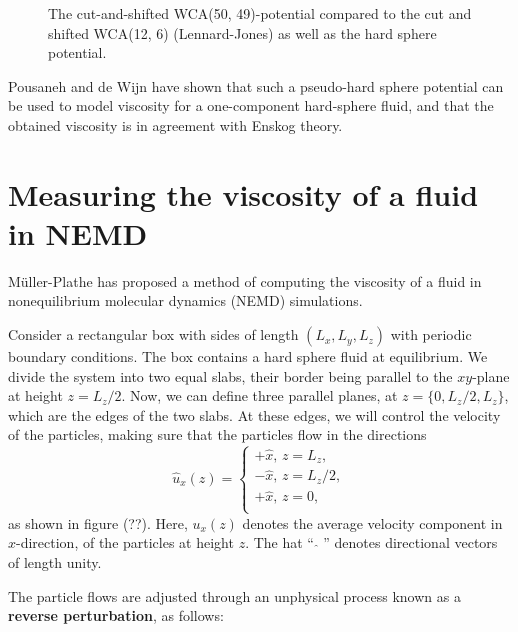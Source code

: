 \begin{figure}[htbp]
    
    \caption{The cut-and-shifted WCA(50, 49)-potential 
            compared to the cut and shifted WCA(12, 6) 
            (Lennard-Jones) as well as the hard sphere 
            potential.
    }
\end{figure}

Pousaneh and de Wijn \cite{ref:pousaneh:shear_viscosity} 
have shown that such a pseudo-hard sphere potential 
can be used to model viscosity for a one-component hard-sphere fluid, 
and that the obtained viscosity is in agreement with Enskog theory.


\section{Measuring the viscosity of a fluid in NEMD}
\label{sec:theory:muller_plathe}
Müller-Plathe \cite{ref:mullerplathe:reversing_the_perturbation} 
has proposed a method of computing the viscosity of a fluid in 
nonequilibrium molecular dynamics (NEMD) simulations.

Consider a rectangular box with sides of length \((L_x, L_y, L_z)\) 
with periodic boundary conditions.
The box contains a hard sphere fluid at equilibrium.
We divide the system into two equal slabs, their border 
being parallel to the $xy$-plane at height \(z = L_z/2\).
Now, we can define three parallel planes, at 
\(z = \{0, L_z/2, L_z\}\), which are the edges of the two slabs.
At these edges, we will control the velocity of the particles, 
making sure that the particles flow in the directions
\[
    \label{eq:velocity_directions}
    \hat{u}_x(z) =
    \begin{cases}
        +\hat{x}, \,z = L_z,    \\
        -\hat{x}, \,z = L_z/2,  \\
        +\hat{x}, \,z = 0,    \\
    \end{cases}
\]
as shown in figure (??). %
Here, \(u_x(z)\) denotes the average velocity component 
in $x$-direction, of the particles at height $z$.
The hat ``\(\,\, \hat{ } \,\,\)'' denotes 
directional vectors of length unity.

The particle flows are adjusted through an unphysical process known as a 
\textbf{reverse perturbation}\cite{ref:mullerplathe:reversing_the_perturbation},
as follows:

